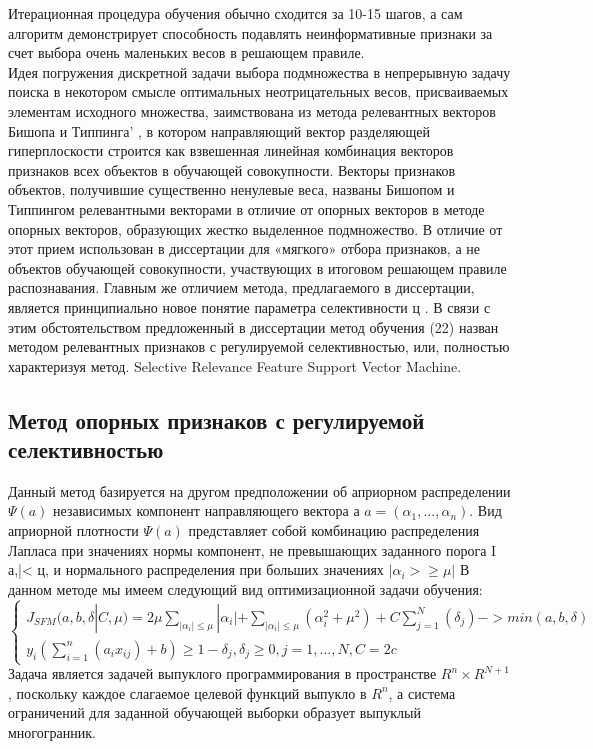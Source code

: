 \documentclass[../body.tex]{subfiles}
\begin{document}
{Итерационная процедура обучения обычно сходится за 10-15 шагов, а сам алгоритм
демонстрирует способность подавлять неинформативные признаки за счет выбора очень
маленьких весов в решающем правиле.
\\
Идея погружения дискретной задачи выбора подмножества в непрерывную задачу поиска в некотором смысле оптимальных неотрицательных весов, присваиваемых элементам исходного множества, заимствована из метода релевантных векторов Бишопа и Типпинга' , в
котором направляющий вектор разделяющей гиперплоскости строится как взвешенная линейная комбинация векторов признаков всех объектов в обучающей совокупности. Векторы
признаков объектов, получившие существенно ненулевые веса, названы Бишопом и Типпингом релевантными векторами в отличие от опорных векторов в методе опорных векторов, образующих жестко выделенное подмножество. В отличие от этот прием использован в диссертации для «мягкого» отбора признаков, а не объектов обучающей совокупности,
участвующих в итоговом решающем правиле распознавания. Главным же отличием метода,
предлагаемого в диссертации, является принципиально новое понятие параметра селективности ц .
В связи с этим обстоятельством предложенный в диссертации метод обучения (22)
назван методом релевантных признаков с регулируемой селективностью, или, полностью
характеризуя метод. Selective Relevance Feature Support Vector Machine.
\subsection{Метод опорных признаков с регулируемой селективностью}
Данный метод базируется на другом
предположении об априорном распределении $\varPsi(a)$ независимых компонент направляющего вектора а $a=(\alpha_1, ..., \alpha_n)$. Вид априорной плотности $\varPsi(a)$ представляет собой комбинацию распределения Лапласа при значениях нормы компонент, не превышающих заданного
порога I а,|< ц, и нормального распределения при больших значениях $|\alpha_{i}>\geq\mu|$ 
В данном методе мы имеем следующий вид оптимизационной задачи обучения:
$$\left\{\begin{matrix}
	J_{SFM}(a, b, \delta |C,\mu) = 2\mu\sum_{|\alpha_{i}|\leq\mu}|\alpha_{i}| + \sum_{|\alpha_{i}|\leq\mu}(\alpha_{i}^2 + \mu^2)+ C\sum_{j=1}^{N}(\delta_j)->min(a,b,\delta)
	\\
	y_i(\sum_{i=1}^{n}(a_ix_{ij})+b)\geq1-\delta_j, \delta_j \geq 0, j= 1,...,N, C=2c
\end{matrix}\right.$$
Задача является задачей выпуклого программирования в пространстве $R^n \times R^{N+1}$, поскольку каждое слагаемое целевой функций выпукло в $R^n$, а система ограничений для заданной обучающей выборки образует выпуклый многогранник.

}
\end{document}
